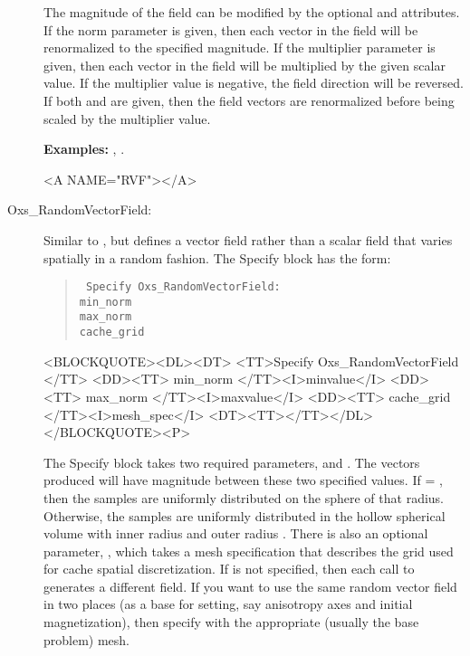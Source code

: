 \begin{description}
   The magnitude of the field can be modified by the optional
    and  attributes.  If the norm
   parameter is given, then each vector in the field will be
   renormalized to the specified magnitude.  If the multiplier parameter
   is given, then each vector in the field will be multiplied by the
   given scalar value.  If the multiplier value is negative, the field
   direction will be reversed.  If both  and 
   are given, then the field vectors are renormalized before being
   scaled by the multiplier value.

\textbf{Examples:} , .

\begin{rawhtml}<A NAME="RVF"></A>\end{rawhtml}%
%
\item[Oxs\_RandomVectorField:]
Similar to
%
, but defines a vector field rather than a scalar field that
varies spatially in a random fashion.  The Specify block has the form:
      \begin{latexonly}
      \begin{quote}\tt
      Specify Oxs\_RandomVectorField: \ocb\\
       \bi min\_norm \\
       \bi max\_norm \\
       \bi cache\_grid \\
      \ccb
      \end{quote}
      \end{latexonly}
      \begin{rawhtml}<BLOCKQUOTE><DL><DT>
      <TT>Specify Oxs_RandomVectorField {</TT>
      <DD><TT> min_norm </TT><I>minvalue</I>
      <DD><TT> max_norm </TT><I>maxvalue</I>
      <DD><TT> cache_grid </TT><I>mesh_spec</I>
      <DT><TT>}</TT></DL></BLOCKQUOTE><P>
      \end{rawhtml}
The Specify block takes two required parameters, 
and .  The vectors produced will have magnitude
between these two specified values.  If  = ,
then the samples are uniformly distributed on the sphere of that radius.
Otherwise, the samples are uniformly distributed in the hollow spherical
volume with inner radius  and outer radius .
There is also an optional parameter, , which takes
a mesh specification that describes the grid used for cache spatial
discretization.  If  is not specified, then each
call to  generates a different field.  If you
want to use the same random vector field in two places (as a base for
setting, say anisotropy axes and initial magnetization), then specify
 with the appropriate (usually the base problem)
mesh.


\end{description}
